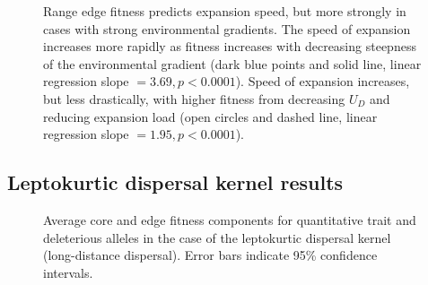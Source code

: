 
\begin{figure}[h!]
\centering
{}
\caption[ ~ - Range edge fitness predicts expansion speed.]{Range edge fitness predicts expansion speed, but more strongly in cases with strong environmental gradients. The speed of expansion increases more rapidly as fitness increases with decreasing steepness of the environmental gradient (dark blue points and solid line, linear regression slope $= 3.69, p < 0.0001$). Speed of expansion increases, but less drastically, with higher fitness from decreasing $U_D$ and reducing expansion load (open circles and dashed line, linear regression slope $=1.95, p < 0.0001$).}
\label{fig:fitspeed}
\end{figure}


\clearpage{}


\subsection*{Leptokurtic dispersal kernel results}


\begin{figure}[h!]
\centering
{}
\caption[ ~ - Leptokurtic dispersal kernel fitness results.]{Average core and edge fitness components for quantitative trait and deleterious alleles in the case of the leptokurtic dispersal kernel (long-distance dispersal). Error bars indicate 95\% confidence intervals.}
\label{fig:leptokurt}
\end{figure}


